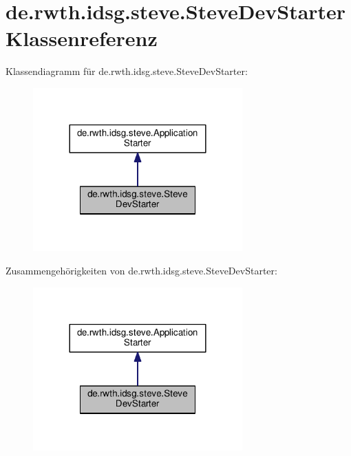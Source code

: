 \hypertarget{classde_1_1rwth_1_1idsg_1_1steve_1_1_steve_dev_starter}{\section{de.\+rwth.\+idsg.\+steve.\+Steve\+Dev\+Starter Klassenreferenz}
\label{classde_1_1rwth_1_1idsg_1_1steve_1_1_steve_dev_starter}
}


Klassendiagramm für de.\+rwth.\+idsg.\+steve.\+Steve\+Dev\+Starter\+:\nopagebreak
\begin{figure}[H]
\begin{center}
\leavevmode
\includegraphics[width=228pt]{classde_1_1rwth_1_1idsg_1_1steve_1_1_steve_dev_starter__inherit__graph}
\end{center}
\end{figure}


Zusammengehörigkeiten von de.\+rwth.\+idsg.\+steve.\+Steve\+Dev\+Starter\+:\nopagebreak
\begin{figure}[H]
\begin{center}
\leavevmode
\includegraphics[width=228pt]{classde_1_1rwth_1_1idsg_1_1steve_1_1_steve_dev_starter__coll__graph}
\end{center}
\end{figure}
